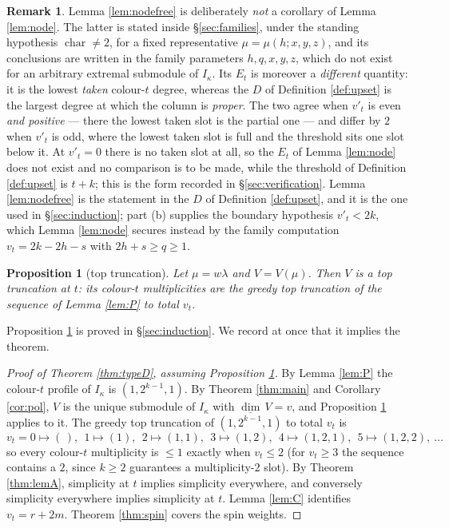 \documentclass[reqno]{amsart}
\theoremstyle{plain}
\newtheorem{proposition}[theorem]{Proposition}
\theoremstyle{definition}
\newtheorem{remark}[theorem]{Remark}
\newcommand{\dimv}{\underline{\dim}\,}
\newcommand{\la}{\lambda}
\newcommand{\ka}{\kappa}
\begin{document}
\begin{remark}\label{rem:nodefree}
Lemma \ref{lem:nodefree} is deliberately \emph{not} a corollary of Lemma
\ref{lem:node}.  The latter is stated inside \S\ref{sec:families}, under the
standing hypothesis $\operatorname{char}\ne2$, for a fixed representative
$\mu=\mu(h;x,y,z)$, and its conclusions are written in the family parameters
$h,q,x,y,z$, which do not exist for an arbitrary extremal submodule of
$I_\ka$.  Its $E_t$ is moreover a \emph{different} quantity: it is the lowest
\emph{taken} colour-$t$ degree, whereas the $D$ of Definition \ref{def:upset}
is the largest degree at which the column is \emph{proper}.  The two agree when
$v'_t$ is even \emph{and positive} --- there the lowest taken slot is the
partial one --- and differ by $2$ when $v'_t$ is odd, where the lowest taken
slot is full and the threshold sits one slot below it.  At $v'_t=0$ there is no
taken slot at all, so the $E_t$ of Lemma \ref{lem:node} does not exist and no
comparison is to be made, while the threshold of Definition \ref{def:upset} is
$t+k$; this is the form recorded in \S\ref{sec:verification}.  Lemma \ref{lem:nodefree} is the statement in
the $D$ of Definition \ref{def:upset}, and it is the one used in
\S\ref{sec:induction}; part \textup{(b)} supplies the boundary hypothesis
$v'_t<2k$, which Lemma \ref{lem:node} secures instead by the family
computation $v_t=2k-2h-s$ with $2h+s\ge q\ge1$.
\end{remark}

\begin{proposition}[top truncation]\label{prop:T}
Let $\mu=w\la$ and $V=V(\mu)$.  Then $V$ is a top truncation at $t$: its
colour-$t$ multiplicities are the greedy top truncation of the sequence of
Lemma \ref{lem:P} to total $v_t$.
\end{proposition}

Proposition \ref{prop:T} is proved in \S\ref{sec:induction}.  We record at once
that it implies the theorem.

\begin{proof}[Proof of Theorem \ref{thm:typeD}, assuming Proposition
\ref{prop:T}]
By Lemma \ref{lem:P} the colour-$t$ profile of $I_\ka$ is $(1,2^{k-1},1)$.  By
Theorem \ref{thm:main} and Corollary \ref{cor:pol}, $V$ is the unique submodule
of $I_\ka$ with $\dimv V=v$, and Proposition \ref{prop:T} applies to it.  The
greedy top truncation of $(1,2^{k-1},1)$ to total $v_t$ is
\[
 v_t=0\mapsto(\,),\ \ 1\mapsto(1),\ \ 2\mapsto(1,1),\ \ 3\mapsto(1,2),
 \ \ 4\mapsto(1,2,1),\ \ 5\mapsto(1,2,2),\ \dots
\]
so every colour-$t$ multiplicity is $\le1$ exactly when $v_t\le2$ (for
$v_t\ge3$ the sequence contains a $2$, since $k\ge2$ guarantees a
multiplicity-$2$ slot).  By Theorem \ref{thm:lemA}, simplicity at $t$ implies
simplicity everywhere, and conversely simplicity everywhere implies simplicity
at $t$.  Lemma \ref{lem:C} identifies $v_t=r+2m$.  Theorem \ref{thm:spin}
covers the spin weights.
\end{proof}
\end{document}
